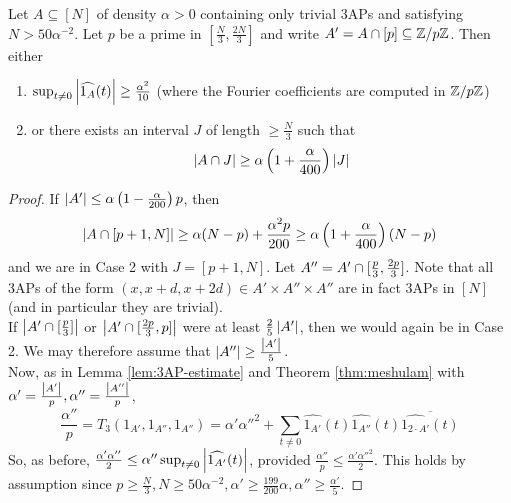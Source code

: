 \documentclass{article}
\begin{document}
\begin{nlemma}
  Let $A \subseteq [N]$ of density $\alpha > 0$ containing only trivial 3APs and satisfying $N > 50\alpha^{-2}$. Let $p$ be a prime in $[\frac N3, \frac{2N}3]$ and write $A' = A \cap [p] \subseteq \mathbb Z/p\mathbb Z$. Then either
  \begin{enumerate}
    \item $\sup_{t \ne 0} \left\lvert \widehat{1_A}(t)\right\rvert \ge \frac{\alpha^2}{10}$ (where the Fourier coefficients are computed in $\mathbb Z/p\mathbb Z$)
    \item or there exists an interval $J$ of length $\ge \frac N3$ such that
    $$\left\lvert A \cap J\right\rvert \ge \alpha\left(1 + \frac\alpha{400}\right)\left\lvert J\right\rvert$$
  \end{enumerate}
\end{nlemma}
\begin{proof}
  If $\left\lvert A'\right\rvert \le \alpha\left(1 - \frac\alpha{200}\right)p$, then
  $$\left\lvert A \cap [p + 1, N]\right\rvert \ge \alpha(N - p) + \frac{\alpha^2p}{200} \ge \alpha\left(1 + \frac\alpha{400}\right)(N - p)$$
  and we are in Case 2 with $J = [p + 1, N]$. Let $A'' = A' \cap [\frac p3, \frac{2p}3]$. Note that all 3APs of the form $(x, x + d, x + 2d) \in A' \times A'' \times A''$ are in fact 3APs in $[N]$ (and in particular they are trivial). \\
  If $\left\lvert A' \cap [\frac p3]\right\rvert$ or $\left\lvert A' \cap [\frac{2p}3, p]\right\rvert$ were at least $\frac 25\left\lvert A'\right\rvert$, then we would again be in Case 2. We may therefore assume that $\left\lvert A''\right\rvert \ge \frac{\left\lvert A'\right\rvert}5$. \\
  Now, as in Lemma \ref{lem:3AP-estimate} and Theorem \ref{thm:meshulam} with $\alpha' = \frac{\left\lvert A'\right\rvert}p, \alpha'' = \frac{\left\lvert A''\right\rvert}p$,
  $$\frac{\alpha''}p = T_3(1_{A'}, 1_{A''}, 1_{A''}) = \alpha'\alpha''^2 + \sum_{t \ne 0}\widehat{1_{A'}}(t)\widehat{1_{A''}}(t)\overline{\widehat{1_{2 \cdot A'}}(t)}$$
  So, as before, $\frac{\alpha'\alpha''}2 \le \alpha''\sup_{t \ne 0} \left\lvert \widehat{1_{A'}}(t)\right\rvert$, provided $\frac{\alpha''}p \le \frac{\alpha'\alpha''^2}2$. This holds by assumption since $p \ge \frac N3, N \ge 50\alpha^{-2}, \alpha' \ge \frac{199}{200}\alpha, \alpha'' \ge \frac{\alpha'}5$.
\end{proof}
\end{document}
